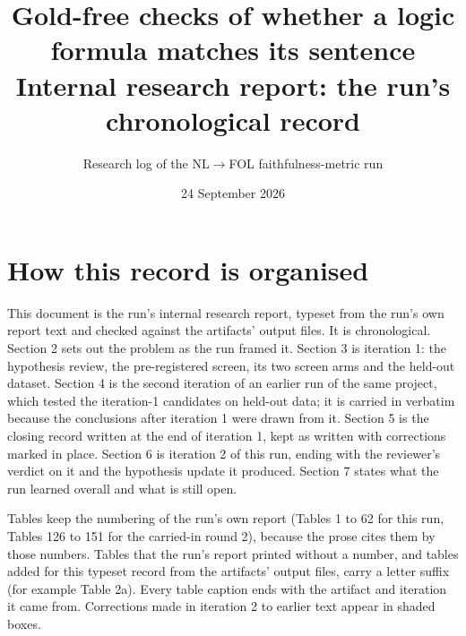 \documentclass[11pt,letterpaper]{article}
\title{Gold-free checks of whether a logic formula matches its sentence\\[4pt]\large Internal research report: the run's chronological record}
\author{Research log of the NL$\rightarrow$FOL faithfulness-metric run}
\date{24 September 2026}
\begin{document}
\maketitle
\tableofcontents
\clearpage
\section{How this record is organised}

This document is the run's internal research report, typeset from the run's own report text and checked against the artifacts' output files. It is chronological. Section 2 sets out the problem as the run framed it. Section 3 is iteration 1: the hypothesis review, the pre-registered screen, its two screen arms and the held-out dataset. Section 4 is the second iteration of an earlier run of the same project, which tested the iteration-1 candidates on held-out data; it is carried in verbatim because the conclusions after iteration 1 were drawn from it. Section 5 is the closing record written at the end of iteration 1, kept as written with corrections marked in place. Section 6 is iteration 2 of this run, ending with the reviewer's verdict on it and the hypothesis update it produced. Section 7 states what the run learned overall and what is still open.

Tables keep the numbering of the run's own report (Tables 1 to 62 for this run, Tables 126 to 151 for the carried-in round 2), because the prose cites them by those numbers. Tables that the run's report printed without a number, and tables added for this typeset record from the artifacts' output files, carry a letter suffix (for example Table 2a). Every table caption ends with the artifact and iteration it came from. Corrections made in iteration 2 to earlier text appear in shaded boxes.
\end{document}
